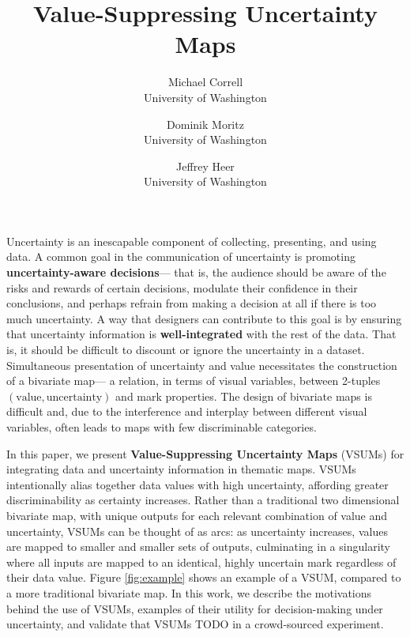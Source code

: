 \documentclass{vgtc}                          %
\title{Value-Suppressing Uncertainty Maps}
\author{Michael Correll\\ %
        \scriptsize University of Washington %
\and Dominik Moritz\\ %
     \scriptsize University of Washington %
\and Jeffrey Heer\\ %
     \scriptsize University of Washington}
\begin{document}


\maketitle




Uncertainty is an inescapable component of collecting, presenting, and using data. A common goal in the communication of uncertainty is promoting \textbf{uncertainty-aware decisions}--- that is, the audience should be aware of the risks and rewards of certain decisions, modulate their confidence in their conclusions, and perhaps refrain from making a decision at all if there is too much uncertainty.  A way that designers can contribute to this goal is by ensuring that uncertainty information is \textbf{well-integrated} with the rest of the data. That is, it should be difficult to discount or ignore the uncertainty in a dataset. Simultaneous presentation of uncertainty and value necessitates the construction of a bivariate map--- a relation, in terms of visual variables, between 2-tuples $(\text{value}, \text{uncertainty})$ and mark properties. The design of bivariate maps is difficult and, due to the interference and interplay between different visual variables, often leads to maps with few discriminable categories. 

In this paper, we present \textbf{Value-Suppressing Uncertainty Maps} (VSUMs) for integrating data and uncertainty information in thematic maps. VSUMs intentionally alias together data values with high uncertainty, affording greater discriminability as certainty increases. Rather than a traditional two dimensional bivariate map, with unique outputs for each relevant combination of value and uncertainty, VSUMs can be thought of as arcs: as uncertainty increases, values are mapped to smaller and smaller sets of outputs, culminating in a singularity where all inputs are mapped to an identical, highly uncertain mark regardless of their data value. Figure \ref{fig:example} shows an example of a VSUM, compared to a more traditional bivariate map. In this work, we describe the motivations behind the use of VSUMs, examples of their utility for decision-making under uncertainty, and validate that VSUMs TODO in a crowd-sourced experiment.
\end{document}
